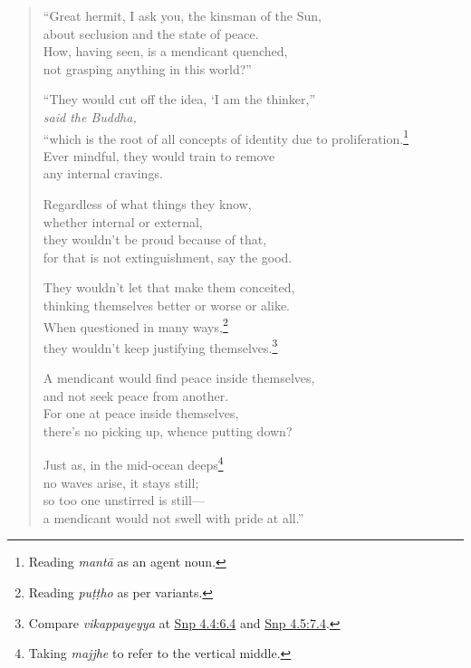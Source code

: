 \documentclass[12pt,openany]{book}%
\newcommand*{\scspeaker}[1]{\hspace{2em}\textit{#1}}
\begin{document}
\begin{verse}%
“Great hermit, I ask you, the kinsman of the Sun, \\
about seclusion and the state of peace. \\
How, having seen, is a mendicant quenched, \\
not grasping anything in this world?” 

“They would cut off the idea, ‘I am the thinker,” \\
\scspeaker{said the Buddha, }\\
“which is the root of all concepts of identity due to proliferation.\footnote{Reading \textit{\textsanskrit{mantā}}  as an agent noun. } \\
Ever mindful, they would train to remove \\
any internal cravings. 

Regardless of what things they know, \\
whether internal or external, \\
they wouldn’t be proud because of that, \\
for that is not extinguishment, say the good. 

They wouldn’t let that make them conceited, \\
thinking themselves better or worse or alike. \\
When questioned in many ways,\footnote{Reading \textit{\textsanskrit{puṭṭho}} as per variants. } \\
they wouldn’t keep justifying themselves.\footnote{Compare \textit{vikappayeyya} at \href{https://suttacentral.net/snp4.4/en/sujato\#6.4}{Snp 4.4:6.4} and \href{https://suttacentral.net/snp4.5/en/sujato\#7.4}{Snp 4.5:7.4}. } 

A mendicant would find peace inside themselves, \\
and not seek peace from another. \\
For one at peace inside themselves, \\
there’s no picking up, whence putting down? 

Just as, in the mid-ocean deeps\footnote{Taking \textit{majjhe} to refer to the vertical middle. } \\
no waves arise, it stays still; \\
so too one unstirred is still—\\
a mendicant would not swell with pride at all.” 


\end{verse}
\end{document}
